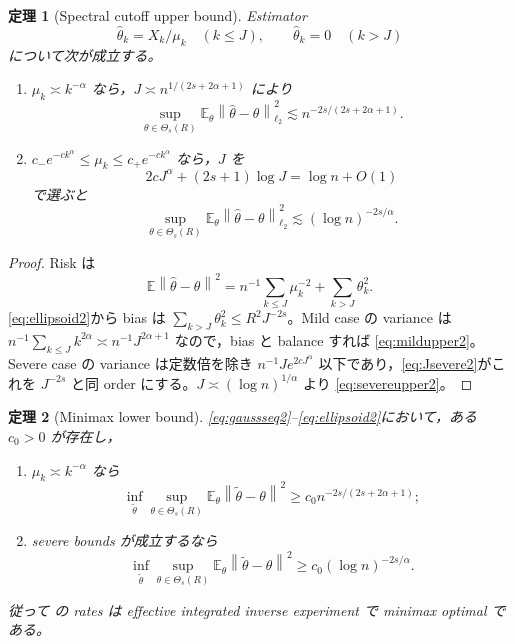 \documentclass[11pt,a4paper]{ltjsarticle}
\newtheorem{theorem}{定理}[section]
\theoremstyle{remark}
\newcommand{\E}{\mathbb E}
\newcommand{\wh}{\widehat}
\newcommand{\wt}{\widetilde}
\newcommand{\norm}[1]{\left\lVert#1\right\rVert}
\begin{document}
\begin{theorem}[Spectral cutoff upper bound]\label{thm:cutoff2}
Estimator
\[
\wh\theta_k=X_k/\mu_k\quad(k\le J),
\qquad
\wh\theta_k=0\quad(k>J)
\]
について次が成立する。
\begin{enumerate}[label=(\roman*)]
\item $\mu_k\asymp k^{-\alpha}$ なら，$J\asymp n^{1/(2s+2\alpha+1)}$ により
\begin{equation}
\sup_{\theta\in\Theta_s(R)}
\E_\theta\norm{\wh\theta-\theta}_{\ell_2}^2
\lesssim n^{-2s/(2s+2\alpha+1)}.
\label{eq:mildupper2}
\end{equation}
\item $c_-e^{-ck^\alpha}\le\mu_k\le c_+e^{-ck^\alpha}$ なら，$J$ を
\begin{equation}
2cJ^\alpha+(2s+1)\log J=\log n+O(1)
\label{eq:Jsevere2}
\end{equation}
で選ぶと
\begin{equation}
\sup_{\theta\in\Theta_s(R)}
\E_\theta\norm{\wh\theta-\theta}_{\ell_2}^2
\lesssim(\log n)^{-2s/\alpha}.
\label{eq:severeupper2}
\end{equation}
\end{enumerate}
\end{theorem}

\begin{proof}
Risk は
\[
\E\norm{\wh\theta-\theta}^2
=n^{-1}\sum_{k\le J}\mu_k^{-2}
+\sum_{k>J}\theta_k^2.
\]
\eqref{eq:ellipsoid2}から bias は $\sum_{k>J}\theta_k^2\le R^2J^{-2s}$。Mild case の variance は $n^{-1}\sum_{k\le J}k^{2\alpha}\asymp n^{-1}J^{2\alpha+1}$ なので，bias と balance すれば \eqref{eq:mildupper2}。Severe case の variance は定数倍を除き $n^{-1}Je^{2cJ^\alpha}$ 以下であり，\eqref{eq:Jsevere2}がこれを $J^{-2s}$ と同 order にする。$J\asymp(\log n)^{1/\alpha}$ より \eqref{eq:severeupper2}。
\end{proof}

\begin{theorem}[Minimax lower bound]\label{thm:minimax2}
\eqref{eq:gaussseq2}--\eqref{eq:ellipsoid2}において，ある $c_0>0$ が存在し，
\begin{enumerate}[label=(\roman*)]
\item $\mu_k\asymp k^{-\alpha}$ なら
\begin{equation}
\inf_{\wt\theta}
\sup_{\theta\in\Theta_s(R)}
\E_\theta\norm{\wt\theta-\theta}^2
\ge c_0n^{-2s/(2s+2\alpha+1)};
\label{eq:mildlower2}
\end{equation}
\item severe bounds が成立するなら
\begin{equation}
\inf_{\wt\theta}
\sup_{\theta\in\Theta_s(R)}
\E_\theta\norm{\wt\theta-\theta}^2
\ge c_0(\log n)^{-2s/\alpha}.
\label{eq:severelower2}
\end{equation}
\end{enumerate}
従って の rates は effective integrated inverse experiment で minimax optimal である。
\end{theorem}
\end{document}
